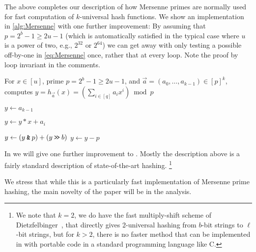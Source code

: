 \vspace{1em}

The above completes our description of how Mersenne primes are
normally used for fast computation of $k$-universal hash functions.
We show an implementation in \cref{alg:Mersenne} with one further improvement:
By assuming that $p=2^b-1\geq 2u-1$
(which is automatically satisfied in the typical case where $u$ is a power
of two, e.g., $2^{32}$ or $2^{64}$)
we can get away with only testing a possible off-by-one in \cref{eq:Mersenne} once, rather that at every loop.
Note the proof by loop invariant in the comments.

\begin{algorithm}[H]
   \caption{
      For $x\in [u]$, prime $p=2^b-1\geq 2u-1$,
      and $\vec a=(a_0,\ldots,a_{k-1})\in[p]^k$,
      computes $y=h_{\vec a}(x)=\left(\sum_{i\in[q]}a_i x^i\right)\bmod p$
   }\label{alg:Mersenne}
   \begin{algorithmic}
      \State $y\gets a_{k-1}$

      \State $y\gets y*x+a_i$

      \State $y\gets (y\mathbin{\texttt{\&}} p)+(y\mathbin{\texttt{>\!>}} b)$
      \EndFor
      \State $y\gets y-p$
      \EndIf
   \end{algorithmic}
\end{algorithm}


In  we will give one further improvement to .
Mostly the description above is a fairly standard description of state-of-the-art hashing.
\footnote{We note that $k=2$, we do have the fast multiply-shift scheme of Dietzfelbinger~\cite{dietzfel96universal}, that directly gives 2-universal
hashing from $b$-bit strings to $\ell$-bit strings, but for $k>2$,
there is no faster method that can be implemented in with portable code
in a standard programming language like C.}

We stress that while this is a particularly fast implementation of Mersenne prime hashing, the main novelty of the paper will be in the analysis.






